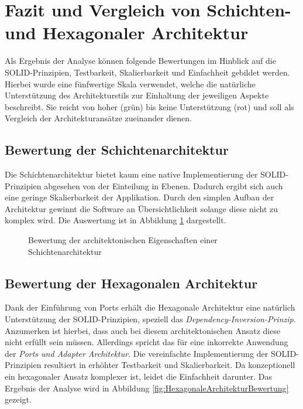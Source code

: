 \documentclass[conference]{IEEEtran}
\begin{document}
\section{Fazit und Vergleich von Schichten- und Hexagonaler Architektur} 

Als Ergebnis der Analyse können folgende Bewertungen im Hinblick auf die SOLID-Prinzipien, Testbarkeit, Skalierbarkeit und Einfachheit gebildet werden. Hierbei wurde eine fünfwertige Skala verwendet, welche die natürliche Unterstützung des Architekturstils zur Einhaltung der jeweiligen Aspekte beschreibt. Sie reicht von hoher (grün) bis keine Unterstützung (rot) und soll als Vergleich der Architekturansätze zueinander dienen.

\subsection{Bewertung der Schichtenarchitektur}

Die Schichtenarchitektur bietet kaum eine native Implementierung der SOLID-Prinzipien abgesehen von der Einteilung in Ebenen. Dadurch ergibt sich auch eine geringe Skalierbarkeit der Applikation. Durch den simplen Aufbau der Architektur gewinnt die Software an Übersichtlichkeit solange diese nicht zu komplex wird. Die Auswertung ist in Abbildung \ref{ref:SchichtenarchitekturBewertung} dargestellt.

\begin{figure}[htbp]
	
	\caption{Bewertung der architektonischen Eigenschaften einer Schichtenarchitektur}
	\label{ref:SchichtenarchitekturBewertung}
\end{figure}

\subsection{Bewertung der Hexagonalen Architektur}

Dank der Einführung von Ports erhält die Hexagonale Architektur eine natürlich Unterstützung der SOLID-Prinzipien, speziell das \emph{Dependency-Inversion-Prinzip}. Anzumerken ist hierbei, dass auch bei diesem architektonischen Ansatz diese nicht erfüllt sein müssen. Allerdings spricht das für eine inkorrekte Anwendung der \emph{Ports und Adapter Architektur}. Die vereinfachte Implementierung der SOLID-Prinzipien resultiert in erhöhter Testbarkeit und Skalierbarkeit. Da konzeptionell ein hexagonaler Ansatz komplexer ist, leidet die Einfachheit darunter. Das Ergebnis der Analyse wird in Abbildung \ref{fig:HexagonaleArchitekturBewertung} gezeigt.
\end{document}
